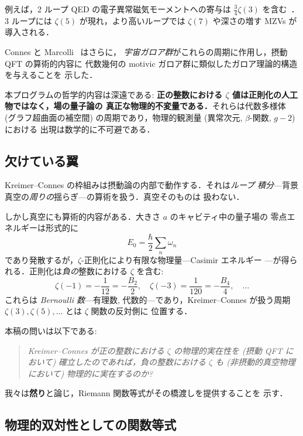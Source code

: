 \documentclass[11pt,a4paper]{article}
\begin{document}
例えば，2 ループ QED の電子異常磁気モーメントへの寄与は
$\frac{3}{4}\zeta(3)$ を含む~\cite{Laporta2017}．3 ループには
$\zeta(5)$ が現れ，より高いループでは $\zeta(7)$ や深さの増す
MZVs が導入される．

Connes と Marcolli~\cite{ConnesMarcolli2008} はさらに，
\emph{宇宙ガロア群}がこれらの周期に作用し，摂動 QFT の算術的内容に
代数幾何の motivic ガロア群に類似したガロア理論的構造を与えることを
示した．

本プログラムの哲学的内容は深遠である:
\textbf{正の整数における $\zeta$ 値は正則化の人工物ではなく，場の量子論の
真正な物理的不変量である．}それらは代数多様体 (グラフ超曲面の補空間)
の周期であり，物理的観測量 (異常次元, $\beta$-関数, $g-2$) における
出現は数学的に不可避である．

\subsection{欠けている翼}

Kreimer--Connes の枠組みは摂動論の内部で動作する．それは\emph{ループ
積分}---背景真空の\emph{周りの}揺らぎ---の算術を扱う．真空そのものは
扱わない．

しかし真空にも算術的内容がある．大きさ $a$ のキャビティ中の量子場の
零点エネルギーは形式的に
\begin{equation}\label{eq:zpe}
E_0 = \frac{\hbar}{2}\sum_n \omega_n
\end{equation}
であり発散するが，$\zeta$-正則化により有限な物理量---Casimir エネルギー
---が得られる．正則化は\emph{負の}整数における $\zeta$ を含む:
\begin{equation}
\zeta(-1) = -\frac{1}{12} = -\frac{B_2}{2}, \quad
\zeta(-3) = \frac{1}{120} = -\frac{B_4}{4}, \quad \ldots
\end{equation}
これらは \emph{Bernoulli 数}---有理数, 代数的---であり，Kreimer--Connes
が扱う周期 $\zeta(3), \zeta(5), \ldots$ とは $\zeta$ 関数の反対側に
位置する．

本稿の問いは以下である:
\begin{quote}
\emph{Kreimer--Connes が正の整数における $\zeta$ の物理的実在性を (摂動 QFT
において) 確立したのであれば，負の整数における $\zeta$ も (非摂動的真空物理
において) 物理的に実在するのか?}
\end{quote}

我々は\textbf{然り}と論じ，Riemann 関数等式がその橋渡しを提供することを
示す．

\subsection{物理的双対性としての関数等式}
\end{document}
